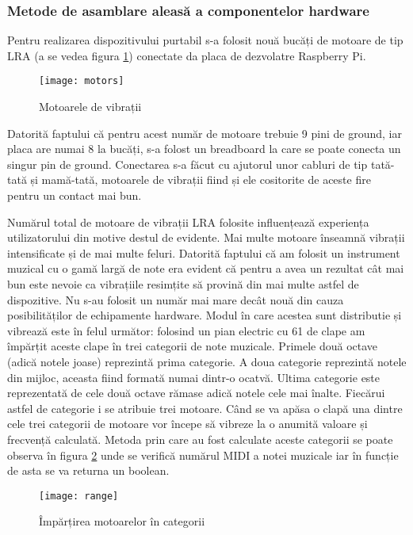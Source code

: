 \documentclass[../IoMusT.tex]{subfiles}
\begin{document}
\subsubsection{Metode de asamblare aleasă a componentelor hardware}
Pentru realizarea dispozitivului purtabil s-a folosit nouă bucăți de motoare de tip LRA (a se vedea figura \ref{fig:motors}) conectate da placa de dezvolatre Raspberry Pi.
\begin{figure}[h]
\centering
\texttt{[image: motors]}
\caption{Motoarele de vibrații}
\label{fig:motors}
\end{figure}  
 Datorită faptului că pentru acest număr de motoare trebuie 9 pini de ground, iar placa are numai 8 la bucăți, s-a folost un breadboard  la care se poate conecta un singur pin de ground. Conectarea s-a făcut cu ajutorul unor cabluri de tip tată-tată și mamă-tată, motoarele de vibrații fiind și ele cositorite de aceste fire pentru un contact mai bun.
\\
\par Numărul total de motoare de vibrații LRA folosite influențează experiența utilizatorului din motive destul de evidente. Mai multe motoare înseamnă vibrații intensificate și de mai multe feluri. Datorită faptului că am folosit un instrument muzical cu o gamă largă de note era evident că pentru a avea un rezultat cât mai bun este nevoie ca vibrațiile resimțite să provină din mai multe astfel de dispozitive. Nu s-au folosit un număr mai mare decât nouă din cauza posibilităților de echipamente hardware. Modul în care acestea sunt distributie și vibrează este în felul următor: folosind un pian electric cu 61 de clape am împărțit aceste clape în trei categorii de note muzicale. Primele două octave (adică notele joase) reprezintă prima categorie. A doua categorie reprezintă notele din mijloc, aceasta fiind formată numai dintr-o ocatvă. Ultima categorie este reprezentată de cele două octave rămase adică notele cele mai înalte. Fiecărui astfel de categorie i se atribuie trei motoare. Când se va apăsa o clapă una dintre cele trei categorii de motoare vor începe să vibreze la o anumită valoare și frecvență calculată. Metoda prin care au fost calculate aceste categorii se poate observa în figura \ref{fig:range} unde se verifică numărul MIDI a notei muzicale iar în funcție de asta se va returna un boolean.
\begin{figure}[h]
\centering
\texttt{[image: range]}
\caption{Împărțirea motoarelor în categorii}
\label{fig:range}
\end{figure}  
\end{document}

